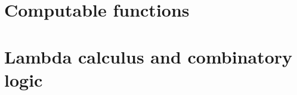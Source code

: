 \documentclass[oneside]{book}
\begin{document}
\part{Computable functions}











\part{Lambda calculus and combinatory logic}



\end{document}
